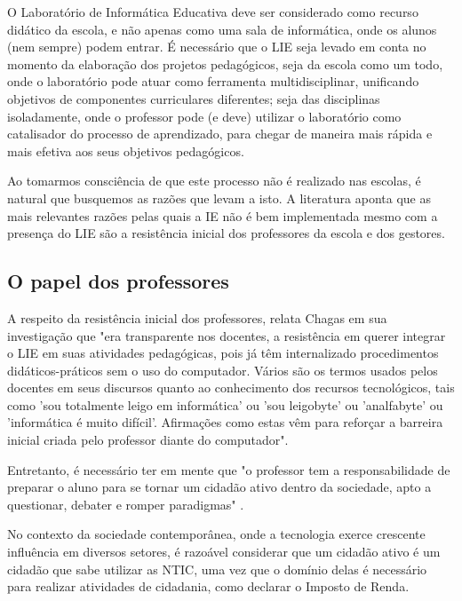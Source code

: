O Laboratório de Informática Educativa deve ser considerado como recurso didático da escola, e não apenas como uma sala de informática, onde os alunos (nem sempre) podem entrar. É necessário que o LIE seja levado em conta no momento da elaboração dos projetos pedagógicos, seja da escola como um todo, onde o laboratório pode atuar como ferramenta multidisciplinar, unificando objetivos de componentes curriculares diferentes; seja das disciplinas isoladamente, onde o professor pode (e deve) utilizar o laboratório como catalisador do processo de aprendizado, para chegar de maneira mais rápida e mais efetiva aos seus objetivos pedagógicos.

Ao tomarmos consciência de que este processo não é realizado nas escolas, é natural que busquemos as razões que levam a isto. A literatura aponta que as mais relevantes razões pelas quais a IE não é bem implementada mesmo com a presença do LIE são a resistência inicial dos professores da escola e dos gestores.

\subsection{O papel dos professores}\label{sec:LABEL_CHP_REF_TEO_SEC_RES_PROF}

A respeito da resistência inicial dos professores, relata Chagas \cite{art:REF_ART_CHAGAS} em sua investigação que "era transparente nos docentes, a resistência em querer integrar o LIE em suas atividades pedagógicas, pois já têm internalizado procedimentos didáticos-práticos sem o uso do computador. Vários são os termos usados pelos docentes em seus discursos quanto ao conhecimento dos recursos tecnológicos, tais como 'sou totalmente leigo em informática' ou 'sou leigobyte' ou 'analfabyte' ou 'informática é muito difícil'. Afirmações como estas vêm para reforçar a barreira inicial criada pelo professor diante do computador".

Entretanto, é necessário ter em mente que "o professor tem a responsabilidade de preparar o aluno para se tornar um cidadão ativo dentro da sociedade, apto a questionar, debater e romper paradigmas" \cite{art:REF_ART_OLIVEIRA}.

No contexto da sociedade contemporânea, onde a tecnologia exerce crescente influência em diversos setores, é razoável considerar que um cidadão ativo é um cidadão que sabe utilizar as NTIC, uma vez que o domínio delas é necessário para realizar atividades de cidadania, como declarar o Imposto de Renda. %

